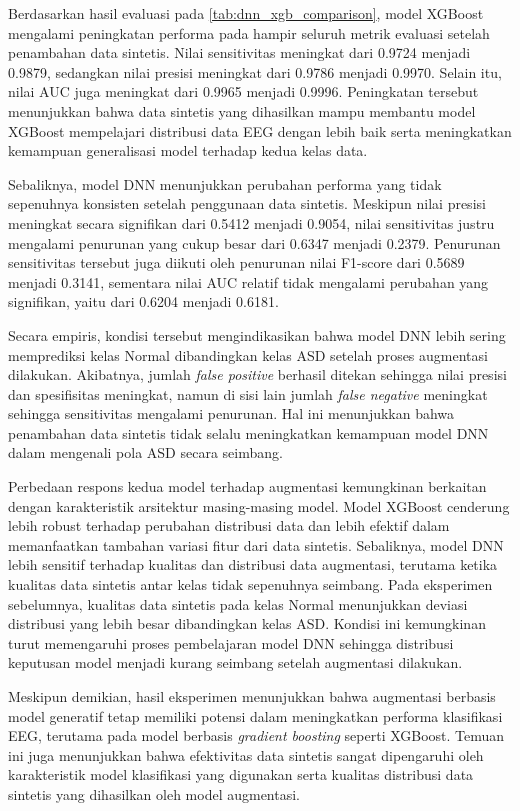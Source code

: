 Berdasarkan hasil evaluasi pada \ref{tab:dnn_xgb_comparison}, model XGBoost mengalami peningkatan performa pada hampir seluruh metrik evaluasi setelah penambahan data sintetis. Nilai sensitivitas meningkat dari 0.9724 menjadi 0.9879, sedangkan nilai presisi meningkat dari 0.9786 menjadi 0.9970. Selain itu, nilai AUC juga meningkat dari 0.9965 menjadi 0.9996. Peningkatan tersebut menunjukkan bahwa data sintetis yang dihasilkan mampu membantu model XGBoost mempelajari distribusi data EEG dengan lebih baik serta meningkatkan kemampuan generalisasi model terhadap kedua kelas data.

Sebaliknya, model DNN menunjukkan perubahan performa yang tidak sepenuhnya konsisten setelah penggunaan data sintetis. Meskipun nilai presisi meningkat secara signifikan dari 0.5412 menjadi 0.9054, nilai sensitivitas justru mengalami penurunan yang cukup besar dari 0.6347 menjadi 0.2379. Penurunan sensitivitas tersebut juga diikuti oleh penurunan nilai F1-score dari 0.5689 menjadi 0.3141, sementara nilai AUC relatif tidak mengalami perubahan yang signifikan, yaitu dari 0.6204 menjadi 0.6181.

Secara empiris, kondisi tersebut mengindikasikan bahwa model DNN lebih sering memprediksi kelas Normal dibandingkan kelas ASD setelah proses augmentasi dilakukan. Akibatnya, jumlah \textit{false positive} berhasil ditekan sehingga nilai presisi dan spesifisitas meningkat, namun di sisi lain jumlah \textit{false negative} meningkat sehingga sensitivitas mengalami penurunan. Hal ini menunjukkan bahwa penambahan data sintetis tidak selalu meningkatkan kemampuan model DNN dalam mengenali pola ASD secara seimbang.

Perbedaan respons kedua model terhadap augmentasi kemungkinan berkaitan dengan karakteristik arsitektur masing-masing model. Model XGBoost cenderung lebih robust terhadap perubahan distribusi data dan lebih efektif dalam memanfaatkan tambahan variasi fitur dari data sintetis. Sebaliknya, model DNN lebih sensitif terhadap kualitas dan distribusi data augmentasi, terutama ketika kualitas data sintetis antar kelas tidak sepenuhnya seimbang. Pada eksperimen sebelumnya, kualitas data sintetis pada kelas Normal menunjukkan deviasi distribusi yang lebih besar dibandingkan kelas ASD. Kondisi ini kemungkinan turut memengaruhi proses pembelajaran model DNN sehingga distribusi keputusan model menjadi kurang seimbang setelah augmentasi dilakukan.

Meskipun demikian, hasil eksperimen menunjukkan bahwa augmentasi berbasis model generatif tetap memiliki potensi dalam meningkatkan performa klasifikasi EEG, terutama pada model berbasis \textit{gradient boosting} seperti XGBoost. Temuan ini juga menunjukkan bahwa efektivitas data sintetis sangat dipengaruhi oleh karakteristik model klasifikasi yang digunakan serta kualitas distribusi data sintetis yang dihasilkan oleh model augmentasi.


